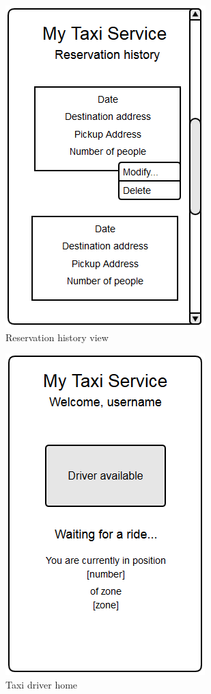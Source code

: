 \begin{figure}
\centering
\includegraphics{tex-images/ui-passenger-history}
\caption{Reservation history view}
\end{figure}



\begin{figure}
\centering
\includegraphics{tex-images/ui-driver-home}
\caption{Taxi driver home}
\end{figure}

